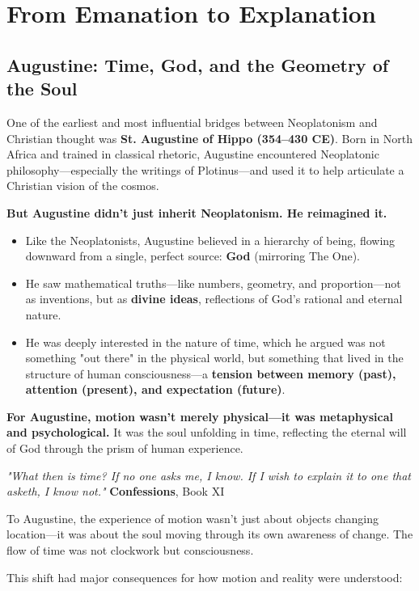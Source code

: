 \section{From Emanation to Explanation}

\subsection{Augustine: Time, God, and the Geometry of the Soul}

One of the earliest and most influential bridges between Neoplatonism and Christian thought was \textbf{St. Augustine of Hippo (354–430 CE)}. Born in North Africa and trained in classical rhetoric, Augustine encountered Neoplatonic philosophy—especially the writings of Plotinus—and used it to help articulate a Christian vision of the cosmos.

\textbf{But Augustine didn’t just inherit Neoplatonism. He reimagined it.}

\begin{itemize}
    \item Like the Neoplatonists, Augustine believed in a hierarchy of being, flowing downward from a single, perfect source: \textbf{God} (mirroring The One).
    \item He saw mathematical truths—like numbers, geometry, and proportion—not as inventions, but as \textbf{divine ideas}, reflections of God’s rational and eternal nature.
    \item He was deeply interested in the nature of time, which he argued was not something "out there" in the physical world, but something that lived in the structure of human consciousness—a \textbf{tension between memory (past), attention (present), and expectation (future)}.
\end{itemize}

\textbf{For Augustine, motion wasn’t merely physical—it was metaphysical and psychological.} It was the soul unfolding in time, reflecting the eternal will of God through the prism of human experience.

\textit{"What then is time? If no one asks me, I know. If I wish to explain it to one that asketh, I know not."}  
\textbf{Confessions}, Book XI

To Augustine, the experience of motion wasn’t just about objects changing location—it was about the soul moving through its own awareness of change. The flow of time was not clockwork but consciousness.

\vspace{1em}
\noindent This shift had major consequences for how motion and reality were understood:

